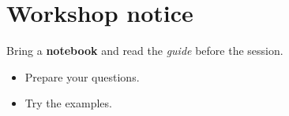 \chapter*{Workshop notice}
Bring a \textbf{notebook} and read the \emph{guide} before the session.

\begin{itemize}
  \item Prepare your questions.
  \item Try the examples.
\end{itemize}
